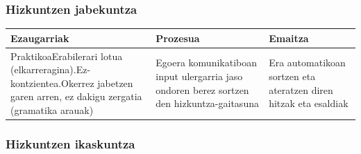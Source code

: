 \documentclass[]{book}
\begin{document}
\hypertarget{hizkuntzen-jabekuntza}{%
\subsubsection{Hizkuntzen jabekuntza}\label{hizkuntzen-jabekuntza}}

\begin{longtable}[]{@{}lll@{}}
\toprule
\begin{minipage}[b]{0.30\columnwidth}\raggedright
Ezaugarriak\strut
\end{minipage} & \begin{minipage}[b]{0.30\columnwidth}\raggedright
Prozesua\strut
\end{minipage} & \begin{minipage}[b]{0.30\columnwidth}\raggedright
Emaitza\strut
\end{minipage}\tabularnewline
\midrule
\endhead
\begin{minipage}[t]{0.30\columnwidth}\raggedright
PraktikoaErabilerari lotua (elkarreragina).Ez-kontzientea.Okerrez jabetzen garen arren, ez dakigu zergatia (gramatika arauak)\strut
\end{minipage} & \begin{minipage}[t]{0.30\columnwidth}\raggedright
Egoera komunikatiboan input ulergarria jaso ondoren berez sortzen den hizkuntza-gaitasuna\strut
\end{minipage} & \begin{minipage}[t]{0.30\columnwidth}\raggedright
Era automatikoan sortzen eta ateratzen diren hitzak eta esaldiak\strut
\end{minipage}\tabularnewline
\bottomrule
\end{longtable}

\hypertarget{hizkuntzen-ikaskuntza}{%
\subsubsection{Hizkuntzen ikaskuntza}\label{hizkuntzen-ikaskuntza}}
\end{document}
